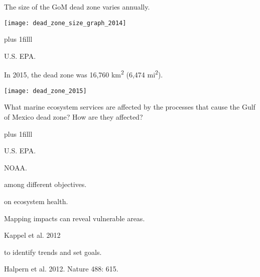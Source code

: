 \documentclass[t]{beamer}
\begin{document}
\begin{frame}[t]{The size of the GoM dead zone varies annually.}

	\texttt{[image: dead\_zone\_size\_graph\_2014]}
	
	\vskip0pt plus 1filll

\hfill\tiny U.S. EPA.
\end{frame}

\begin{frame}[t]{In 2015, the dead zone was 16,760 km\textsuperscript{2} (6,474 mi\textsuperscript{2}).}

	\texttt{[image: dead\_zone\_2015]}
	
	{\large What marine ecosystem services are affected by the processes that cause the Gulf of Mexico dead zone? How are they affected?}
	
	\vskip0pt plus 1filll

\hfill\tiny U.S. EPA.
\end{frame}



{
\begin{frame}[b]
\hfill\tiny NOAA.
\end{frame}
}



{
\begin{frame}[t]{ among different objectives.}
\end{frame}
}

{
\begin{frame}[t]{ on ecosystem health.}
\end{frame}
}

{
\begin{frame}[b]{Mapping impacts can reveal vulnerable areas.}

\tiny\hfill Kappel et al. 2012
\end{frame}
}

{
\begin{frame}[b]{ to identify trends and set goals.}

\tiny\hfill Halpern et al. 2012. Nature 488: 615.
\end{frame}
}
\end{document}
